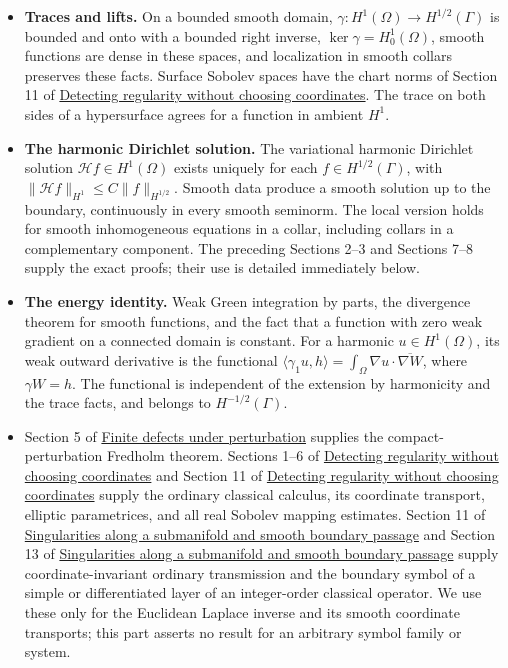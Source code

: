 \documentclass[
  11pt,
]{article}
\providecommand{\tightlist}{%
  \setlength{\itemsep}{0pt}\setlength{\parskip}{0pt}}
\begin{document}
\begin{itemize}
\tightlist
\item
  \textbf{Traces and lifts.} On a bounded smooth domain,
  \(\gamma:H^1(\Omega)\to H^{1/2}(\Gamma)\) is bounded and onto with a
  bounded right inverse, \(\ker\gamma=H^1_0(\Omega)\), smooth functions
  are dense in these spaces, and localization in smooth collars
  preserves these facts. Surface Sobolev spaces have the chart norms of
  Section 11 of \href{geometric-microlocal-calculus.pdf}{Detecting
  regularity without choosing coordinates}. The trace on both sides of a
  hypersurface agrees for a function in ambient \(H^1\).
\item
  \textbf{The harmonic Dirichlet solution.} The variational harmonic
  Dirichlet solution \(\mathcal H f\in H^1(\Omega)\) exists uniquely for
  each \(f\in H^{1/2}(\Gamma)\), with
  \(\|\mathcal H f\|_{H^1}\le C\|f\|_{H^{1/2}}\). Smooth data produce a
  smooth solution up to the boundary, continuously in every smooth
  seminorm. The local version holds for smooth inhomogeneous equations
  in a collar, including collars in a complementary component. The
  preceding Sections 2--3 and Sections 7--8 supply the exact proofs;
  their use is detailed immediately below.
\item
  \textbf{The energy identity.} Weak Green integration by parts, the
  divergence theorem for smooth functions, and the fact that a function
  with zero weak gradient on a connected domain is constant. For a
  harmonic \(u\in H^1(\Omega)\), its weak outward derivative is the
  functional
  \(\langle\gamma_1u,h\rangle=\int_\Omega\nabla u\cdot\overline{\nabla W}\),
  where \(\gamma W=h\). The functional is independent of the extension
  by harmonicity and the trace facts, and belongs to
  \(H^{-1/2}(\Gamma)\).
\item
  Section 5 of \href{fredholm-stability.pdf}{Finite defects under
  perturbation} supplies the compact-perturbation Fredholm theorem.
  Sections 1--6 of \href{geometric-microlocal-calculus.pdf}{Detecting
  regularity without choosing coordinates} and Section 11 of
  \href{geometric-microlocal-calculus.pdf}{Detecting regularity without
  choosing coordinates} supply the ordinary classical calculus, its
  coordinate transport, elliptic parametrices, and all real Sobolev
  mapping estimates. Section 11 of
  \href{conormal-transmission.pdf}{Singularities along a submanifold and
  smooth boundary passage} and Section 13 of
  \href{conormal-transmission.pdf}{Singularities along a submanifold and
  smooth boundary passage} supply coordinate-invariant ordinary
  transmission and the boundary symbol of a simple or differentiated
  layer of an integer-order classical operator. We use these only for
  the Euclidean Laplace inverse and its smooth coordinate transports;
  this part asserts no result for an arbitrary symbol family or system.
\end{itemize}
\end{document}
